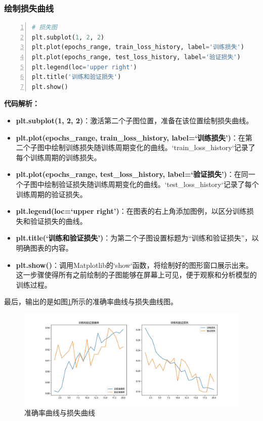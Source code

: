 \subsubsection{绘制损失曲线}

\begin{lstlisting}[language={python},label={绘制损失曲线},caption={绘制损失曲线}, basicstyle=\footnotesize\ttfamily, breaklines=true, numbers=left, frame=single,keepspaces=true,showstringspaces=false]
# 损失图
plt.subplot(1, 2, 2)
plt.plot(epochs_range, train_loss_history, label='训练损失')
plt.plot(epochs_range, test_loss_history, label='验证损失')
plt.legend(loc='upper right')
plt.title('训练和验证损失')
plt.show()
\end{lstlisting}
\textbf{代码解析：}
\begin{itemize}
    \item \textbf{plt.subplot(1, 2, 2)}：激活第二个子图位置，准备在该位置绘制损失曲线。
    \item \textbf{plt.plot(epochs\_range, train\_loss\_history, label=‘训练损失’)}：在第二个子图中绘制训练损失随训练周期变化的曲线。`train\_loss\_history`记录了每个训练周期的训练损失。
    \item \textbf{plt.plot(epochs\_range, test\_loss\_history, label=‘验证损失’)}：在同一个子图中绘制验证损失随训练周期变化的曲线。`test\_loss\_history`记录了每个训练周期的验证损失。
    \item \textbf{plt.legend(loc=‘upper right’)}：在图表的右上角添加图例，以区分训练损失和验证损失的曲线。
    \item \textbf{plt.title(‘训练和验证损失’)}：为第二个子图设置标题为“训练和验证损失”，以明确图表的内容。
    \item \textbf{plt.show()}：调用Matplotlib的`show`函数，将绘制好的图形窗口展示出来。这一步骤使得所有之前绘制的子图能够在屏幕上可见，便于观察和分析模型的训练过程。
\end{itemize}

最后，输出的是如图\ref{准确率曲线与损失曲线}所示的准确率曲线与损失曲线图。
\begin{figure}[ht]
  \centering
  \includegraphics[width=\linewidth]{image/6/accuracy_loss_plots.jpg}
  \caption{准确率曲线与损失曲线}
  \label{准确率曲线与损失曲线}
\end{figure}

